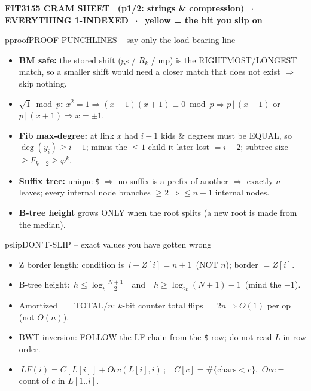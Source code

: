 \documentclass[9pt]{extarticle}
\newcommand{\To}{\ensuremath{\Rightarrow}}
\newcommand{\C}[1]{\texttt{#1}}
\newcommand{\key}[1]{\colorbox{hl}{\ensuremath{\,#1\,}}}     %
\begin{document}
{\centering\bfseries\small FIT3155 CRAM SHEET \ (p1/2: strings \& compression) $\;\cdot\;$ EVERYTHING 1-INDEXED $\;\cdot\;$ \colorbox{hl}{yellow = the bit you slip on}\par}
\vspace{2pt}

\begin{multicols}{2}
\begin{panel}{pproof}{PROOF PUNCHLINES -- say only the load-bearing line}
\begin{itemize}
\item \textbf{BM safe:} the stored shift (gs / $R_k$ / mp) is the RIGHTMOST/LONGEST match, so a smaller shift would need a closer match that does not exist \To{} skip nothing.
\item \textbf{$\sqrt{1}\bmod p$:} $x^2{=}1\To(x{-}1)(x{+}1){\equiv}0\bmod p\To p\,|\,(x{-}1)$ or $p\,|\,(x{+}1)\To x{=}\pm1$.
\item \textbf{Fib max-degree:} at link $x$ had $i{-}1$ kids \& degrees must be EQUAL, so $\deg(y_i)\ge i{-}1$; minus the $\le1$ child it later lost $=i{-}2$; subtree size $\ge F_{k+2}\ge\varphi^k$.
\item \textbf{Suffix tree:} unique \C{\$} \To{} no suffix is a prefix of another \To{} exactly $n$ leaves; every internal node branches $\ge2\To\le n{-}1$ internal nodes.
\item \textbf{B-tree height} grows ONLY when the root splits (a new root is made from the median).
\end{itemize}
\end{panel}

\begin{panel}{pslip}{DON'T-SLIP -- exact values you have gotten wrong}
\begin{itemize}
\item Z border length: condition is \key{i+Z[i]=n{+}1} (NOT $n$); border $=Z[i]$.
\item B-tree height: \key{h\le\log_t\tfrac{N+1}{2}} \ and \ \key{h\ge\log_{2t}(N{+}1)-1} (mind the $-1$).
\item Amortized $=$ TOTAL$/n$: $k$-bit counter total flips $=2n\To O(1)$ per op (not $O(n)$).
\item BWT inversion: FOLLOW the LF chain from the \C{\$} row; do not read $L$ in row order.
\item \key{LF(i)=C[L[i]]+Occ(L[i],i)};\ \ $C[c]{=}\#\{\text{chars}{<}c\}$,\ $Occ{=}$ count of $c$ in $L[1..i]$.
\end{itemize}
\end{panel}
\end{multicols}
\end{document}
